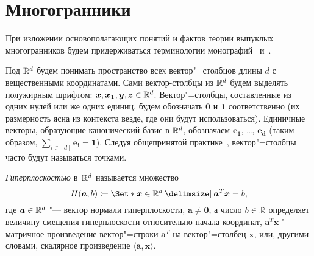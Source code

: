 \begin{comment}
Орграф $D = (V, A)$ называется \emph{транзитивным}, если из условий $(v, u) \in A$ и $(u, w) \in A$ следует $(v, w) \in A$.
Так как мы не рассматриваем графы с петлями, то из транзитивности следует ацикличность.
Таким образом, множество дуг транзитивного графа задает частичный порядок на множестве вершин графа и, наоборот, каждый частичный порядок может быть представлен множеством дуг некоторого транзитивного графа.
Если для каждой пары вершин $u,v \in V$ в множество $A$ входит ровно одна из двух дуг $(v, u)$ и $(u, v)$, то соответствующий орграф называется \emph{турниром}.\label{def:linearOrdering}
Транзитивный турнир задает линейный порядок на множестве вершин.
Поэтому далее, говоря о частичном (линейном) порядке мы часто будем подразумевать соответствующий транзитивный орграф (турнир).
\end{comment}

\section{Многогранники}
\label{sec:polytopes}

При изложении основополагающих понятий и фактов теории выпуклых многогранников будем придерживаться терминологии монографий~\cite{Emelichev:1981} и~\cite{ZieglerBook}.


Под $\mathbb{R}^d$ будем понимать пространство всех вектор"=столбцов длины $d$ с вещественными координатами. 
Сами вектор-столбцы из $\mathbb{R}^d$ будем выделять полужирным шрифтом: $\bm{x}, \bm{x_1}, \bm{y}, \bm{z} \in \mathbb{R}^d$.
Вектор"=столбцы, составленные из одних нулей или же одних единиц, будем обозначать $\bm{0}$ и $\bm{1}$ соответственно
(их размерность ясна из контекста везде, где они будут использоваться).
Единичные векторы, образующие канонический базис в $\mathbb{R}^d$, обозначаем $\bm{e_1}$, \dots, $\bm{e_d}$
(таким образом, $\sum_{i\in[d]} \bm{e_i} = \bm{1}$).
Следуя общепринятой практике~\cite{ZieglerBook},  вектор"=столбцы часто будут называться точками.


\emph{Гиперплоскостью} в~$\mathbb{R}^d$ называется множество
\[
H(\bm{a},b) \coloneqq \Set*{\bm{x}\in\R^d \given \bm{a}^T \bm{x} = b}, 
\]
где $\bm{a} \in \mathbb{R}^d$ "--- вектор нормали гиперплоскости, $\bm{a} \ne \bm{0}$, а число $b \in \mathbb{R}$ определяет величину смещения гиперплоскости относительно начала координат,
$\bm{a}^T \bm{x}$ "--- матричное произведение вектор"=строки $\bm{a}^T$ на вектор"=столбец $\bm{x}$, или, другими словами, скалярное произведение $\langle\bm{a},\bm{x}\rangle$.


